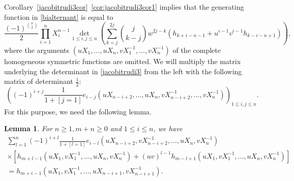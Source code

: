 \documentclass[12pt]{amsart}
\newtheorem{lemma}[theorem]{Lemma}
\theoremstyle{definition}
\numberwithin{equation}{section}
\begin{document}
Corollary~\ref{jacobitrudi3cor}~\eqref{cor:jacobitrudi3cor1} implies that the generating function in \eqref{bialternant} is equal to
\begin{equation}
	\label{jacobitrudi3} 
	\frac{(-1)^{\binom{n}{2}}}{2} \prod_{i=1}^n X_i^{n-1} \det_{1 \le i,j \le n} \left(  \sum_{k=j}^{2j} \binom{j}{k-j} w^{2j-k} 
	(h_{k+i-n-1} + u^{i-1} v^{i-1} h_{k-i-n+1} )  \right),
\end{equation} 
where the arguments $(u X_1,\ldots,u X_n,v X_1^{-1},\ldots,v X_n^{-1})$ of the complete homogeneous symmetric functions are omitted. We will multiply the matrix underlying the determinant in \eqref{jacobitrudi3} from the left with 
the following matrix of determinant $\frac{1}{2}$:
\begin{equation}
	\label{eq:onehalfdet}
	\left( (-1)^{i+j} \frac{1}{1+[j=1]} e_{i-j}(u X_{n-i+2},\ldots,u X_n,v X_{n-i+2}^{-1},\ldots,v X_n^{-1}) \right)_{1 \le i,j \le n}.
\end{equation}
For this purpose, we need the following lemma.
\begin{lemma} For $n \ge 1, m+n \ge 0$ and $1 \le i \le n$, we have 
	\begin{multline*} 
		\sum_{l=1}^n (-1)^{i+l} \frac{1}{1+[l=1]} e_{i-l}(u X_{n-i+2},v X_{n-i+2}^{-1},\ldots,u X_n,v X_n^{-1}) \\
		\times \left[ h_{m+l-1}(u X_1,v X_1^{-1},\ldots,u X_n,v X_n^{-1}) 
		+ (u v)^{l-1} h_{m-l+1}(u X_1,v X_1^{-1},\ldots,u X_n,v X_n^{-1}) \right]  \\
		= h_{m+i-1}(u X_1,v X_1^{-1},\ldots,u X_{n-i+1},v X_{n-i+1}^{-1}).
	\end{multline*} 
\end{lemma} 
\end{document}
